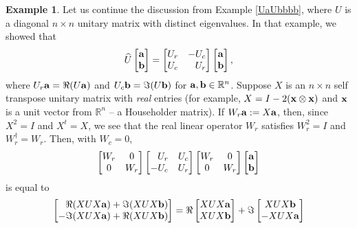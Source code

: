 \documentclass{dis}
\newcommand{\phm}{\phantom{-}}
\theoremstyle{plain}
\theoremstyle{definition}
\newtheorem{Example}[equation]{Example}
\def\R{\mathbb{R}}
\renewcommand{\vec}[1]{{\bf #1}}
\newcommand{\0}{{\color{lightgray}0}}
\begin{document}
\begin{Example}
Let us continue the discussion from Example \ref{UaUbbbb}, where $U$ is a diagonal $n \times n$ unitary matrix with distinct eigenvalues. In that example, we showed that 
$$
\widehat{U}  \begin{bmatrix} \vec{a}\\ \vec{b}\end{bmatrix} =  \begin{bmatrix}
U_r & - U_c\\
U_c &\phm U_r
\end{bmatrix} \begin{bmatrix} \vec{a}\\ \vec{b}\end{bmatrix},
$$
where $U_{r} \vec{a} = \Re (U \vec{a})$ and $U_{c} \vec{b} = \Im(U \vec{b})$ for $\vec{a}, \vec{b} \in \R^{n}$. Suppose $X$ is an $n \times n$  self transpose unitary matrix with {\em real} entries (for example, $X = I - 2 (\vec{x} \otimes \vec{x})$ and $\vec{x}$ is a unit vector from $\R^n$ -- a Householder matrix). If $W_{r} \vec{a} := X \vec{a}$, then, since $X^2 = I$ and $X^{t} = X$, we see that the real linear operator $W_{r}$ satisfies $W_{r}^2 = I$ and $W_{r}^{\dagger} = W_r$. Then, with $W_c = 0$, 
$$ \begin{bmatrix} W_{r} & 0\\ 0 & W_{r}\end{bmatrix}  \begin{bmatrix} \phantom{-}U_r &  U_c\\ - U_c & U_r\end{bmatrix}  \begin{bmatrix} W_{r} & 0\\ 0 & W_{r}\end{bmatrix} \begin{bmatrix} \vec{a}\\ \vec{b}\end{bmatrix}$$
is equal to 
\begin{align*}
\begin{bmatrix} \phantom{-}\Re(X U X \vec{a}) + \Im( X U X \vec{b})\\ -\Im(XUX \vec{a}) + \Re(X U X \vec{b})\end{bmatrix} & = \Re \begin{bmatrix} XUX \vec{a}\\ XUX \vec{b}\end{bmatrix} + \Im \begin{bmatrix} XUX \vec{b} \\ -XUX \vec{a}\end{bmatrix}\\

\end{align*}
\end{Example}
\end{document}
